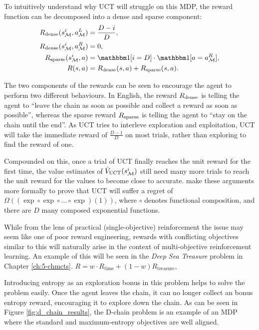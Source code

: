         To intuitively understand why UCT will struggle on this MDP, the reward function can be decomposed into a dense and sparse component:
        \begin{align}
            R_{\dense}(\schain{i},\aL) &= \frac{D-i}{D}, \\
            R_{\dense}(\schain{i},\aR) &= 0, \\
            R_{\sparse}(\schain{i},a) &= \one[i=D] \cdot \one[a=\aR], \\
            R(s,a) &= R_{\dense}(s,a) + R_{\sparse}(s,a).
        \end{align}

        The two components of the rewards can be seen to encourage the agent to perform two different behaviours. In English, the reward $R_{{\textnormal{dense}}}$ is telling the agent to ``leave the chain as soon as possible and collect a reward as soon as possible'', whereas the sparse reward $R_{{\textnormal{sparse}}}$ is telling the agent to ``stay on the chain until the end''. As UCT tries to interleve exploration and exploitation, UCT will take the immediate reward of $\frac{D-1}{D}$ on most trials, rather than exploring to find the reward of one. 

        Compounded on this, once a trial of UCT finally reaches the unit reward for the first time, the value estimates of ${\bar{V}_{{\textnormal{UCT}}}}(s^{i}_{\mathcal{M}})$ still need many more trials to reach the unit reward for the values to become close to accurate. \citet{dchain} make these arguments more formally to prove that UCT will suffer a regret of $\Omega((\exp \circ \exp \circ ... \circ \exp)(1))$, where $\circ$ denotes functional composition, and there are $D$ many composed exponential functions.

        While from the lens of practical (single-objective) reinforcement the issue may seem like one of poor reward engineering, rewards with conflicting objectives similar to this will naturally arise in the context of multi-objective reinforcement learning. An example of this will be seen in the \textit{Deep Sea Treasure} problem in Chapter \ref{ch:5-chmcts}.  $R=w\cdot R_{\text{time}} + (1-w) R_{\text{treasure}}$, 

        Introducing entropy as an exploration bonus in this problem helps to solve the problem easily. Once the agent leaves the chain, it can no longer collect an bonus entropy reward, encouraging it to explore down the chain. As can be seen in Figure \ref{fig:d_chain_results}, the D-chain problem is an example of an MDP where the standard and maximum-entropy objectives are well aligned.

